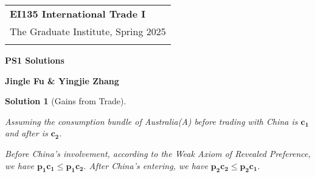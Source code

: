 \documentclass[a4paper,12pt]{article} %
\theoremstyle{nonitalic}
\newtheorem{solution}{Solution}
\begin{document}
\thispagestyle{empty} %

\begin{tabular}{p{15.5cm}} %
{\large \bf EI135 International Trade I} \\
The Graduate Institute, Spring 2025\\
\hline %
\\
\end{tabular} %

\vspace*{0.3cm} %

\begin{center} %
	{\Large \bf PS1 Solutions} %
	\vspace{2mm}
	
	{\bf Jingle Fu \& Yingjie Zhang} %
		
\end{center}  

\vspace{0.4cm}

\begin{solution}[Gains from Trade]
    \

    Assuming the consumption bundle of Australia(A) before trading with China is $\mathbf{c_1}$ and after is $\mathbf{c_2}$.

    Before China's involvement, according to the Weak Axiom of Revealed Preference, we have $\mathbf{p_1} \mathbf{c_1} \leq \mathbf{p_1} \mathbf{c_2}.$
    After China's entering, we have $\mathbf{p_2} \mathbf{c_2} \leq \mathbf{p_2} \mathbf{c_1}.$
\end{solution}
\end{document}
